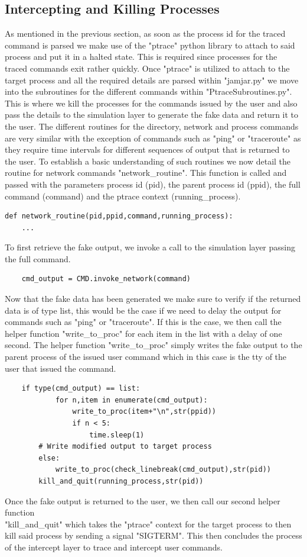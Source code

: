 \subsection{Intercepting and Killing Processes}
As mentioned in the previous section, as soon as the process id for the traced command is parsed we make use of the "ptrace" python library to attach to said process and put it in a halted state. This is required since processes for the traced commands exit rather quickly. Once "ptrace" is utilized to attach to the target process and all the required details are parsed within "jamjar.py" we move into the subroutines for the different commands within "PtraceSubroutines.py". This is where we kill the processes for the commands issued by the user and also pass the details to the simulation layer to generate the fake data and return it to the user. The different routines for the directory, network and process commands are very similar with the exception of commands such as "ping" or "traceroute" as they require time intervals for different sequences of output that is returned to the user. To establish a basic understanding of such routines we now detail the routine for network commands "network\_routine".
This function is called and passed with the parameters process id (pid), the parent process id (ppid), the full command (command) and the ptrace context (running\_process). 
\begin{lstlisting}
def network_routine(pid,ppid,command,running_process):
    ...
\end{lstlisting}
To first retrieve the fake output, we invoke a call to the simulation layer passing the full command.
\begin{lstlisting}
    cmd_output = CMD.invoke_network(command)
\end{lstlisting}
Now that the fake data has been generated we make sure to verify if the returned data is of type list, this would be the case if we need to delay the output for commands such as "ping" or "traceroute". If this is the case, we then call the helper function "write\_to\_proc" for each item in the list with a delay of one second. The helper function "write\_to\_proc" simply writes the fake output to the parent process of the issued user command which in this case is the tty of the user that issued the command.  
\begin{lstlisting}
    if type(cmd_output) == list:
            for n,item in enumerate(cmd_output):
                write_to_proc(item+"\n",str(ppid))
                if n < 5:
                    time.sleep(1)
        # Write modified output to target process
        else:
            write_to_proc(check_linebreak(cmd_output),str(pid))
        kill_and_quit(running_process,str(pid))
\end{lstlisting}
Once the fake output is returned to the user, we then call our second helper function\\ "kill\_and\_quit" which takes the "ptrace" context for the target process to then kill said process by sending a signal "SIGTERM". This then concludes the process of the intercept layer to trace and intercept user commands.

